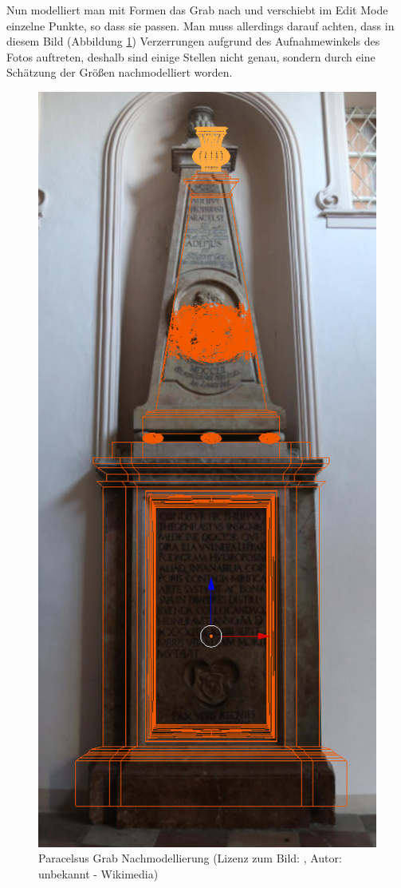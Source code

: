 Nun modelliert man mit Formen das Grab nach und verschiebt im Edit Mode einzelne Punkte, so dass sie passen. Man muss allerdings darauf achten, dass in diesem Bild
(Abbildung \ref{Paracelsus_Grab:image2}) Verzerrungen aufgrund des Aufnahmewinkels des Fotos auftreten, deshalb sind einige Stellen nicht genau, sondern
durch eine Schätzung der Größen nachmodelliert worden.

\begin{figure}[H]
    \centering
    \includegraphics[width=.8\textwidth]{images/Paracelsus-Grab_Nachmodellierung.png}
    \caption{Paracelsus Grab Nachmodellierung (Lizenz zum Bild: \citep{paracelsusgrab:bild}, Autor: unbekannt - Wikimedia)}
    \label{Paracelsus_Grab:image2}
\end{figure}


